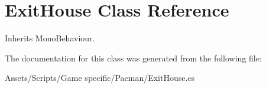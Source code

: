 \hypertarget{class_exit_house}{\section{Exit\-House Class Reference}
\label{class_exit_house}
}


Inherits Mono\-Behaviour.



The documentation for this class was generated from the following file\-:\begin{DoxyCompactItemize}
\item 
Assets/\-Scripts/\-Game specific/\-Pacman/Exit\-House.\-cs\end{DoxyCompactItemize}
